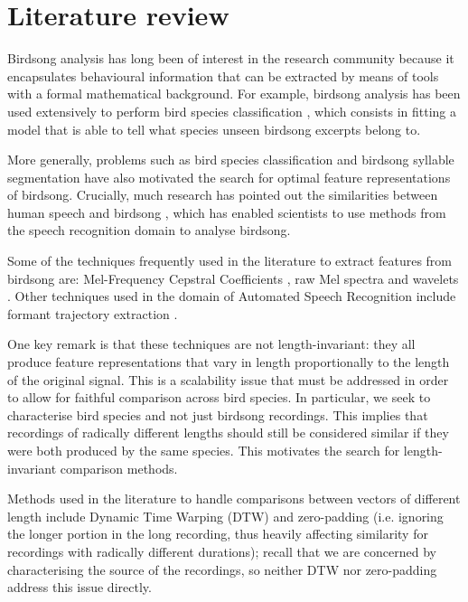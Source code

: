 \documentclass[pdftex,11pt,a4paper]{article}
\theoremstyle{definition}
\theoremstyle{remark}
\begin{document}
\section{Literature review}
\label{section_review}
Birdsong analysis has long been of interest in the research community because it encapsulates behavioural information that can be extracted by means of tools with a formal mathematical background. For example, birdsong analysis has been used extensively to perform bird species classification \cite{Chou2009,Wielgat2012,McIlraith1995,Lee2013,Franzen2003,Silla2013}, which consists in fitting a model that is able to tell what species unseen birdsong excerpts belong to.
\par More generally, problems such as bird species classification and birdsong syllable segmentation have also motivated the search for optimal feature representations of birdsong. Crucially, much research has pointed out the similarities between human speech and birdsong \cite{Snowdon2013,McIlraith1995}, which has enabled scientists to use methods from the speech recognition domain to analyse birdsong.
\par Some of the techniques frequently used in the literature to extract features from birdsong are: Mel-Frequency Cepstral Coefficients \cite{Silla2013,Wielgat2012,Stowell2014,Lopes2011}, raw Mel spectra \cite{Stowell2014} and wavelets \cite{Chou2009}. Other techniques used in the domain of Automated Speech Recognition include formant trajectory extraction \cite{Prica2010,Welling1998}.
\par One key remark is that these techniques are not length-invariant: they all produce feature representations that vary in length proportionally to the length of the original signal. This is a scalability issue that must be addressed in order to allow for faithful comparison across bird species. In particular, we seek to characterise bird species and not just birdsong recordings. This implies that recordings of radically different lengths should still be considered similar if they were both produced by the same species. This motivates the search for length-invariant comparison methods.
\par Methods used in the literature to handle comparisons between vectors of different length include Dynamic Time Warping (DTW) \cite{Jancovic2013,Muda2010} and zero-padding (i.e. ignoring the longer portion in the long recording, thus heavily affecting similarity for recordings with radically different durations); recall that we are concerned by characterising the source of the recordings, so neither DTW nor zero-padding address this issue directly. 
\end{document}
